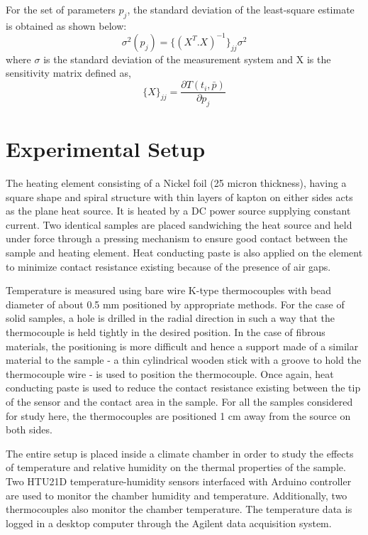 \documentclass[12pt]{report}
\begin{document}
 For the set of parameters $p_j$, the standard deviation of the
least-square estimate is obtained as shown below:
\begin{equation}
\sigma^2(p_j) = \{(X^T.X)^{-1}\}_{jj}\sigma^2
\end{equation}
where \(\sigma\) is the standard deviation of the measurement system and
X is the sensitivity matrix defined as,
\begin{equation}
\{X\}_{jj} = \frac{\partial T(t_i, \bar{p})}{\partial p_j}
\end{equation}


\section*{Experimental Setup}

The heating element consisting of a Nickel foil (25 micron thickness),
having a square shape and spiral structure with thin layers of kapton on
either sides acts as the plane heat source. It is heated by a DC power
source supplying constant current. Two identical samples are placed
sandwiching the heat source and held under force through a pressing
mechanism to ensure good contact between the sample and heating element.
Heat conducting paste is also applied on the element to minimize
contact resistance existing because of the presence of air gaps.

Temperature is measured using bare wire K-type thermocouples with bead diameter of about 0.5 mm positioned
by appropriate methods. For the case of solid samples, a hole is drilled
in the radial direction in such a way that the thermocouple is held
tightly in the desired position. In the case of fibrous materials, the
positioning is more difficult and hence a support made of a similar
material to the sample - a thin cylindrical wooden stick with a groove to hold the thermocouple wire - is used to position the thermocouple. Once again, heat conducting paste is used to reduce the
contact resistance existing between the tip of the sensor and the
contact area in the sample. For all the samples considered for study here, the thermocouples
are positioned 1 cm away from the source on both sides.

The entire setup is placed inside a climate
chamber in order to study the effects of temperature and relative
humidity on the thermal properties of the sample. Two HTU21D temperature-humidity sensors
interfaced with Arduino controller are used to monitor the chamber
humidity and temperature. Additionally, two thermocouples also
monitor the chamber temperature. The temperature data is logged in a
desktop computer through the Agilent data acquisition system.
\\
\end{document}
